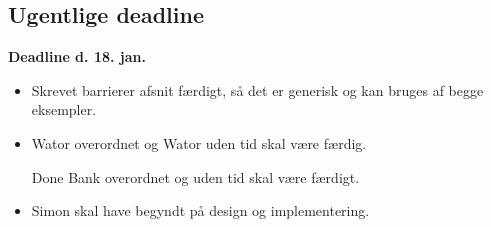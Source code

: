 \subsection*{Ugentlige deadline}
\textbf{Deadline d. 18. jan.}
\begin{itemize}{}{}\tightlist
\item Skrevet barrierer afsnit færdigt, så det er generisk og kan bruges af begge eksempler.
\item Wator overordnet og Wator uden tid skal være færdig.
\item [Done]Bank overordnet og uden tid skal være færdigt. 
\item Simon skal have begyndt på design og implementering.
\end{itemize}
